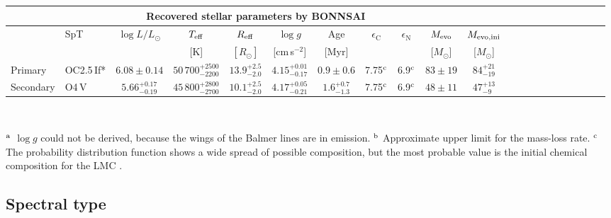 \documentclass[fleqn,usenatbib]{mnras}
\begin{document}
\begin{table*}
\begin{tabular}{@{}l@{~~~}l@{~~~}c@{~~~}c@{~~~}c@{~~~}c@{~~~}c@{~~~}c@{~~~}c@{~~~}c@{~~~}c@{~~~}c@{~~~}c@{~~~}c@{~~~}c@{~~~}c@{~~~}c@{~~~}c@{~~~}c@{~~~}c@{~~~}c@{}}
		\hline
				\multicolumn{11}{c}{Recovered stellar parameters by BONNSAI} \\
		\hline
		 & SpT & $\log L/L_{\odot}$ & $T_{\rm eff}$ & $R_{\rm eff}$ & $\log g$ & Age & $\epsilon_{\mathrm{C}}$ & $\epsilon_{\mathrm{N}}$ & $ M_{\rm evo}$ & $ M_{\rm evo,ini}$\\
		 &                    & & [K]   &$[R_{\odot}]$        & [cm\,s$^{-2}$] & [$\mathrm{Myr}$] &  &  & [$M_{\odot}$] & [$M_{\odot}$]\\
		\hline
		Primary  & OC2.5\,If* & $6.08\pm 0.14$ & $50\,700^{+2500}_{-2200}$ & $13.9^{+2.5}_{-2.0}$ & $4.15^{+0.01}_{-0.17}$ & $0.9 \pm 0.6$ & 7.75$^{\rm c}$ & 6.9$^{\rm c}$ & $83\pm19$ & $84^{+21}_{-19}$\\
		Secondary& O4\,V & $5.66^{+0.17}_{-0.19}$ & $45\,800^{+2800}_{-2700}$ & $10.1^{+2.5}_{-2.0}$  & $4.17^{+0.05}_{-0.21}$ & $1.6^{+0.7}_{-1.3}$ & 7.75$^{\rm c}$ & 6.9$^{\rm c}$ & $48\pm11$ & $47^{+13}_{-9}$\\
		\hline
	\end{tabular}\\
	\begin{tablenotes}\footnotesize
	\item { $^{\rm a}$ $\log g$ could not be derived, because the wings of the Balmer lines are in emission. $^{\rm b}$ Approximate upper limit for the mass-loss rate. %
	$^{\rm c}$ The probability distribution function shows a wide spread of possible composition, but the most probable value is the initial chemical composition for the LMC \citep{brott2011}.} 
	\end{tablenotes}
\end{table*}

\subsection{Spectral type\label{s:spt}}
\end{document}
